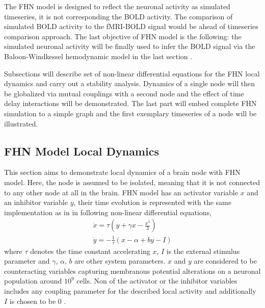 The FHN model is designed to reflect the neuronal activity as simulated timeseries, it is not corresponding the BOLD activity. The comparison of simulated BOLD activity to the fMRI-BOLD signal would be ahead of timeseries comparison approach. The last objective of FHN model is the following: the simulated neuronal activity will be finally used to infer the BOLD signal via the Baloon-Windkessel hemodynamic model in the last section \citep{FRI00}. 

Subsections will describe set of non-linear differential equations for the FHN local dynamics and carry out a stability analysis. Dynamics of a single node will then be globalized via mutual couplings with a second node and the effect of time delay interactions will be demonstrated. The last part will embed complete FHN simulation to a simple graph and the first exemplary timeseries of a node will be illustrated. 





\subsection{FHN Model Local Dynamics}

This section aims to demonstrate local dynamics of a brain node with FHN model. Here, the node is assumed to be isolated, meaning that it is not connected to any other node at all in the brain. FHN model has an activator variable $x$ and an inhibitor variable $y$, their time evolution is represented with the same implementation as in \citep{GHO08, GHO08a} in following non-linear differential equations,
\begin{subequations}
\begin{align}\dot{x} = \tau (y + \gamma x - \frac{x^3}{3})  \label{eqn: frobenius 1}\\  \dot{y} = -\frac{1}{\tau} (x - \alpha + b y - I ) \label{eqn: frobenius 2}   \end{align} 
\end{subequations}
where $\tau$ denotes the time constant accelerating $x$, $I$ is the external stimulus parameter and $\gamma$, $\alpha$, $b$ are other system parameters. $x$ and $y$ are considered to be counteracting variables capturing membranous potential alterations on a neuronal population around $10^9$ cells. Non of the activator or the inhibitor variables includes any coupling parameter for the described local activity and additionally $I$ is chosen to be 0 \citep{GHO08}.

